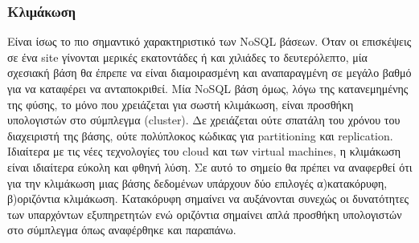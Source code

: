 		\subsubsection{Κλιμάκωση}
		Είναι ίσως το πιο σημαντικό χαρακτηριστικό των NoSQL βάσεων. Όταν οι επισκέψεις σε ένα site γίνονται μερικές εκατοντάδες ή και χιλιάδες το δευτερόλεπτο, μία σχεσιακή βάση θα έπρεπε να είναι διαμοιρασμένη και αναπαραγμένη σε μεγάλο βαθμό για να καταφέρει να ανταποκριθεί. Μία NoSQL βάση όμως, λόγω της κατανεμημένης της φύσης, το μόνο που χρειάζεται για σωστή κλιμάκωση, είναι προσθήκη υπολογιστών στο σύμπλεγμα (cluster). Δε χρειάζεται ούτε σπατάλη του χρόνου του διαχειριστή της βάσης, ούτε πολύπλοκος κώδικας για partitioning και replication. Ιδιαίτερα με τις νέες τεχνολογίες του cloud και των virtual machines, η κλιμάκωση είναι ιδιαίτερα εύκολη και φθηνή λύση\cite{stonebraker2010sql}. Σε αυτό το σημείο θα πρέπει να αναφερθεί ότι για την κλιμάκωση μιας βάσης δεδομένων υπάρχουν δύο επιλογές α)κατακόρυφη, β)οριζόντια κλιμάκωση. Κατακόρυφη σημαίνει να αυξάνονται συνεχώς οι δυνατότητες των υπαρχόντων εξυπηρετητών ενώ οριζόντια σημαίνει απλά προσθήκη υπολογιστών στο σύμπλεγμα όπως αναφέρθηκε και παραπάνω.
		
